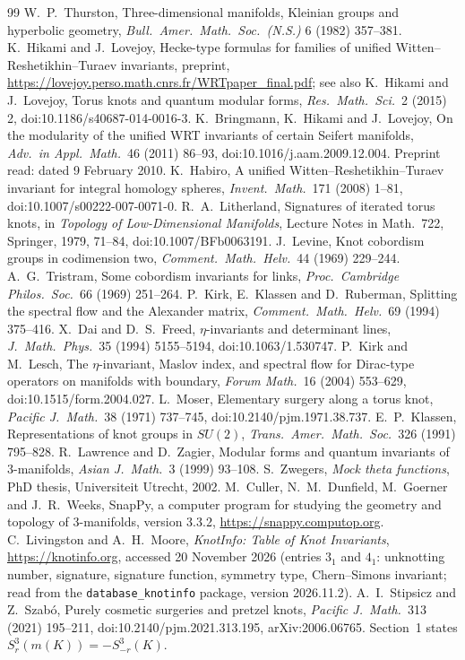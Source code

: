 \documentclass[11pt]{article}
\theoremstyle{definition}
\begin{document}
\begin{thebibliography}{99}
 W.~P.~Thurston, Three-dimensional manifolds, Kleinian groups and hyperbolic geometry, \emph{Bull.\ Amer.\ Math.\ Soc.\ (N.S.)} 6 (1982) 357--381.
 K.~Hikami and J.~Lovejoy, Hecke-type formulas for families of unified Witten--Reshetikhin--Turaev invariants, preprint, \url{https://lovejoy.perso.math.cnrs.fr/WRTpaper_final.pdf}; see also K.~Hikami and J.~Lovejoy, Torus knots and quantum modular forms, \emph{Res.\ Math.\ Sci.}\ 2 (2015) 2, doi:10.1186/s40687-014-0016-3.
 K.~Bringmann, K.~Hikami and J.~Lovejoy, On the modularity of the unified WRT invariants of certain Seifert manifolds, \emph{Adv.\ in Appl.\ Math.}\ 46 (2011) 86--93, doi:10.1016/j.aam.2009.12.004. Preprint read: dated 9 February 2010.
 K.~Habiro, A unified Witten--Reshetikhin--Turaev invariant for integral homology spheres, \emph{Invent.\ Math.}\ 171 (2008) 1--81, doi:10.1007/s00222-007-0071-0.
 R.~A.~Litherland, Signatures of iterated torus knots, in \emph{Topology of Low-Dimensional Manifolds}, Lecture Notes in Math.\ 722, Springer, 1979, 71--84, doi:10.1007/BFb0063191.
 J.~Levine, Knot cobordism groups in codimension two, \emph{Comment.\ Math.\ Helv.}\ 44 (1969) 229--244.
 A.~G.~Tristram, Some cobordism invariants for links, \emph{Proc.\ Cambridge Philos.\ Soc.}\ 66 (1969) 251--264.
 P.~Kirk, E.~Klassen and D.~Ruberman, Splitting the spectral flow and the Alexander matrix, \emph{Comment.\ Math.\ Helv.}\ 69 (1994) 375--416.
 X.~Dai and D.~S.~Freed, $\eta$-invariants and determinant lines, \emph{J.\ Math.\ Phys.}\ 35 (1994) 5155--5194, doi:10.1063/1.530747.
 P.~Kirk and M.~Lesch, The $\eta$-invariant, Maslov index, and spectral flow for Dirac-type operators on manifolds with boundary, \emph{Forum Math.}\ 16 (2004) 553--629, doi:10.1515/form.2004.027.
 L.~Moser, Elementary surgery along a torus knot, \emph{Pacific J.\ Math.}\ 38 (1971) 737--745, doi:10.2140/pjm.1971.38.737.
 E.~P.~Klassen, Representations of knot groups in $SU(2)$, \emph{Trans.\ Amer.\ Math.\ Soc.}\ 326 (1991) 795--828.
 R.~Lawrence and D.~Zagier, Modular forms and quantum invariants of 3-manifolds, \emph{Asian J.\ Math.}\ 3 (1999) 93--108.
 S.~Zwegers, \emph{Mock theta functions}, PhD thesis, Universiteit Utrecht, 2002.
 M.~Culler, N.~M.~Dunfield, M.~Goerner and J.~R.~Weeks, SnapPy, a computer program for studying the geometry and topology of 3-manifolds, version 3.3.2, \url{https://snappy.computop.org}.
 C.~Livingston and A.~H.~Moore, \emph{KnotInfo: Table of Knot Invariants}, \url{https://knotinfo.org}, accessed 20 November 2026 (entries $3_1$ and $4_1$: unknotting number, signature, signature function, symmetry type, Chern--Simons invariant; read from the \texttt{database\_knotinfo} package, version 2026.11.2).
 A.~I.~Stipsicz and Z.~Szab\'o, Purely cosmetic surgeries and pretzel knots, \emph{Pacific J.\ Math.}\ 313 (2021) 195--211, doi:10.2140/pjm.2021.313.195, arXiv:2006.06765. Section~1 states $S^3_r(m(K))=-S^3_{-r}(K)$.
\end{thebibliography}
\end{document}
